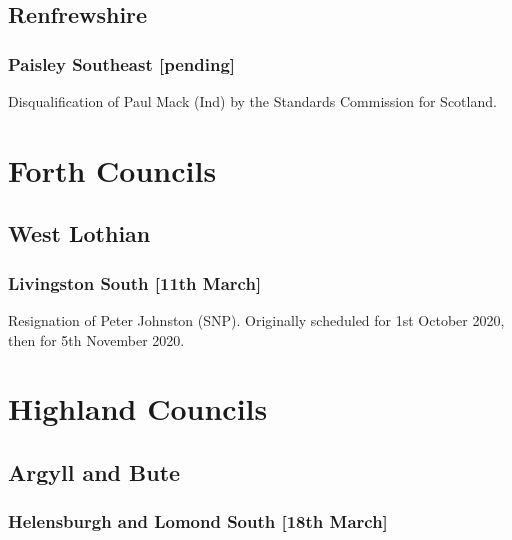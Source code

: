 \documentclass[a4paper,openany]{book}
\begin{document}
\begin{resultsiii}
\subsection*{Renfrewshire}

\subsubsection*{Paisley Southeast \hspace*{\fill}\nolinebreak[1]%
	\enspace\hspace*{\fill}
	[pending]}


Disqualification of Paul Mack (Ind) by the Standards Commission for Scotland.

\section{Forth Councils}

\subsection*{West Lothian}

\subsubsection*{Livingston South \hspace*{\fill}\nolinebreak[1]%
	\enspace\hspace*{\fill}
	[11th March]}


Resignation of Peter Johnston (SNP).
Originally scheduled for 1st October 2020, then for 5th November 2020.

\section{Highland Councils}

\subsection*{Argyll and Bute}

\subsubsection*{Helensburgh and Lomond South \hspace*{\fill}\nolinebreak[1]%
	\enspace\hspace*{\fill}
	[18th March]}


\end{resultsiii}
\end{document}
